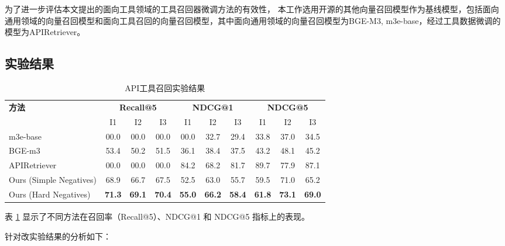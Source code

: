 为了进一步评估本文提出的面向工具领域的工具召回器微调方法的有效性，
本工作选用开源的其他向量召回模型作为基线模型，包括面向
通用领域的向量召回模型和面向工具召回的向量召回模型，其中面向通用领域的向量召回模型为BGE-M3\cite{chen2024bge}, m3e-base\cite{moka2024m3e}，经过工具数据微调的模型为APIRetriever\cite{Qin2023}。

\subsection{实验结果}

\begin{table}[!ht]
  \centering
  \caption{API工具召回实验结果}
  \label{tab:comparison}
  \begin{tabular}{l|ccc|ccc|ccc}
    \toprule
    \textbf{方法} & \multicolumn{3}{c|}{\textbf{Recall@5}} & \multicolumn{3}{c|}{\textbf{NDCG@1}} & \multicolumn{3}{c}{\textbf{NDCG@5}} \\
    & I1 & I2 & I3 & I1 & I2 & I3 & I1 & I2 & I3 \\
    \midrule

    m3e-base            & 00.0 & 00.0 & 00.0 & 00.0 & 32.7 & 29.4 & 33.8 & 37.0 & 34.5 \\
    BGE-m3         & 53.4 & 50.2 & 51.5 & 36.1 & 38.4 & 37.5 & 43.2 & 48.1 & 45.2 \\
    APIRetriever & 00.0 & 00.0 & 00.0 & 84.2 & 68.2 & 81.7 & 89.7 & 77.9 & 87.1 \\
    Ours (Simple Negatives)   & 68.9 & 66.7 & 67.5 & 52.5 & 63.0 & 55.7 & 59.5 & 71.0 & 65.2 \\
    Ours (Hard Negatives)     & \textbf{71.3} & \textbf{69.1} & \textbf{70.4} & \textbf{55.0} & \textbf{66.2} & \textbf{58.4} & \textbf{61.8} & \textbf{73.1} & \textbf{69.0} \\ 
    \bottomrule
  \end{tabular}
\end{table}

表 \ref{tab:comparison} 显示了不同方法在召回率（Recall@5）、NDCG@1 和 NDCG@5 指标上的表现。

针对改实验结果的分析如下：

